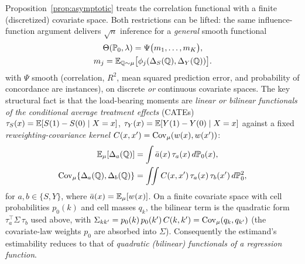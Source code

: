 \documentclass{article}
\newcommand{\PP}{\mathbb{P}}
\begin{document}
Proposition~\ref{prop:asymptotic} treats the correlation functional with a finite
(discretized) covariate space. Both restrictions can be lifted: the same
influence-function argument delivers $\sqrt{n}$ inference for a \emph{general}
smooth functional
\begin{equation}\label{eq:general-estimand}
\begin{gathered}
    \Theta(\PP_0,\lambda) = \Psi\big(m_1,\ldots,m_K\big),\\
    m_j = \E_{\Q\sim\mu}\big[\phi_j(\Delta_S(\Q),\Delta_Y(\Q))\big].
\end{gathered}
\end{equation}
with $\Psi$ smooth (correlation, $R^2$, mean squared prediction error, and
probability of concordance are instances), on discrete \emph{or} continuous
covariate spaces. The key structural fact is that the load-bearing moments are
\emph{linear or bilinear functionals of the conditional average treatment effects}
(CATEs) $\tau_S(x)=\mathbb{E}[S(1)-S(0)\mid X=x]$, $\tau_Y(x)=\mathbb{E}[Y(1)-Y(0)\mid X=x]$
against a fixed \emph{reweighting-covariance kernel} $C(x,x')=\operatorname{Cov}_\mu(w(x),w(x'))$:
\begin{equation}\label{eq:bilinear-body}
\begin{aligned}
    \E_\mu[\Delta_a(\Q)] &= \int \bar a(x)\,\tau_a(x)\,d\PP_0(x),\\
    \Cov_\mu\{\Delta_a(\Q),\Delta_b(\Q)\} &= \iint C(x,x')\,\tau_a(x)\,\tau_b(x')\,d\PP_0^2,
\end{aligned}
\end{equation}
for $a,b\in\{S,Y\}$, where $\bar a(x)=\mathbb{E}_\mu[w(x)]$. On a finite covariate space with
cell probabilities $p_0(k)$ and cell masses $q_k$, the bilinear term is the quadratic
form $\tau_a^\top\Sigma\,\tau_b$ used above, with
$\Sigma_{kk'}=p_0(k)\,p_0(k')\,C(k,k')=\operatorname{Cov}_\mu(q_k,q_{k'})$ (the covariate-law weights
$p_0$ are absorbed into $\Sigma$). Consequently the estimand's estimability
reduces to that of \emph{quadratic (bilinear) functionals of a regression function}.
\end{document}
